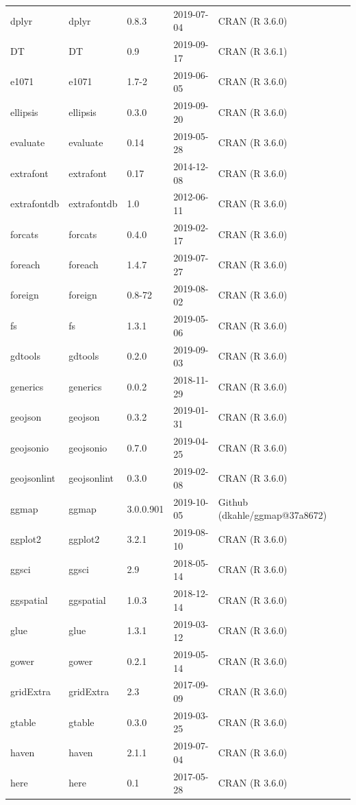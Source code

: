 \documentclass[]{article}
\begin{document}
\begin{longtable}[t]{lllll}
dplyr & dplyr & 0.8.3 & 2019-07-04 & CRAN (R 3.6.0)\\
DT & DT & 0.9 & 2019-09-17 & CRAN (R 3.6.1)\\
e1071 & e1071 & 1.7-2 & 2019-06-05 & CRAN (R 3.6.0)\\
ellipsis & ellipsis & 0.3.0 & 2019-09-20 & CRAN (R 3.6.0)\\
\addlinespace
evaluate & evaluate & 0.14 & 2019-05-28 & CRAN (R 3.6.0)\\
extrafont & extrafont & 0.17 & 2014-12-08 & CRAN (R 3.6.0)\\
extrafontdb & extrafontdb & 1.0 & 2012-06-11 & CRAN (R 3.6.0)\\
forcats & forcats & 0.4.0 & 2019-02-17 & CRAN (R 3.6.0)\\
foreach & foreach & 1.4.7 & 2019-07-27 & CRAN (R 3.6.0)\\
\addlinespace
foreign & foreign & 0.8-72 & 2019-08-02 & CRAN (R 3.6.0)\\
fs & fs & 1.3.1 & 2019-05-06 & CRAN (R 3.6.0)\\
gdtools & gdtools & 0.2.0 & 2019-09-03 & CRAN (R 3.6.0)\\
generics & generics & 0.0.2 & 2018-11-29 & CRAN (R 3.6.0)\\
geojson & geojson & 0.3.2 & 2019-01-31 & CRAN (R 3.6.0)\\
\addlinespace
geojsonio & geojsonio & 0.7.0 & 2019-04-25 & CRAN (R 3.6.0)\\
geojsonlint & geojsonlint & 0.3.0 & 2019-02-08 & CRAN (R 3.6.0)\\
ggmap & ggmap & 3.0.0.901 & 2019-10-05 & Github (dkahle/ggmap@37a8672)\\
ggplot2 & ggplot2 & 3.2.1 & 2019-08-10 & CRAN (R 3.6.0)\\
ggsci & ggsci & 2.9 & 2018-05-14 & CRAN (R 3.6.0)\\
\addlinespace
ggspatial & ggspatial & 1.0.3 & 2018-12-14 & CRAN (R 3.6.0)\\
glue & glue & 1.3.1 & 2019-03-12 & CRAN (R 3.6.0)\\
gower & gower & 0.2.1 & 2019-05-14 & CRAN (R 3.6.0)\\
gridExtra & gridExtra & 2.3 & 2017-09-09 & CRAN (R 3.6.0)\\
gtable & gtable & 0.3.0 & 2019-03-25 & CRAN (R 3.6.0)\\
\addlinespace
haven & haven & 2.1.1 & 2019-07-04 & CRAN (R 3.6.0)\\
here & here & 0.1 & 2017-05-28 & CRAN (R 3.6.0)\\

\end{longtable}
\end{document}
